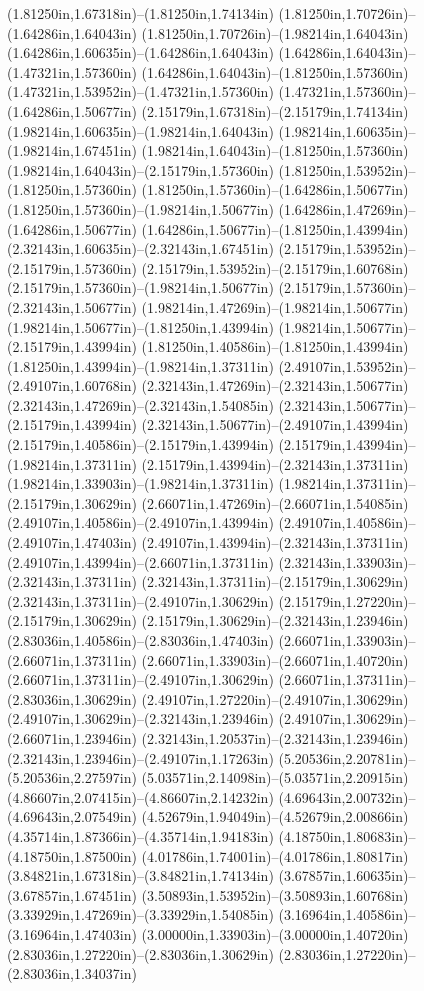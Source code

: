 (1.81250in,1.67318in)--(1.81250in,1.74134in) (1.81250in,1.70726in)--(1.64286in,1.64043in) (1.81250in,1.70726in)--(1.98214in,1.64043in) (1.64286in,1.60635in)--(1.64286in,1.64043in) (1.64286in,1.64043in)--(1.47321in,1.57360in) (1.64286in,1.64043in)--(1.81250in,1.57360in) (1.47321in,1.53952in)--(1.47321in,1.57360in) (1.47321in,1.57360in)--(1.64286in,1.50677in) (2.15179in,1.67318in)--(2.15179in,1.74134in) (1.98214in,1.60635in)--(1.98214in,1.64043in) (1.98214in,1.60635in)--(1.98214in,1.67451in) (1.98214in,1.64043in)--(1.81250in,1.57360in) (1.98214in,1.64043in)--(2.15179in,1.57360in) (1.81250in,1.53952in)--(1.81250in,1.57360in) (1.81250in,1.57360in)--(1.64286in,1.50677in) (1.81250in,1.57360in)--(1.98214in,1.50677in) (1.64286in,1.47269in)--(1.64286in,1.50677in) (1.64286in,1.50677in)--(1.81250in,1.43994in) (2.32143in,1.60635in)--(2.32143in,1.67451in) (2.15179in,1.53952in)--(2.15179in,1.57360in) (2.15179in,1.53952in)--(2.15179in,1.60768in) (2.15179in,1.57360in)--(1.98214in,1.50677in) (2.15179in,1.57360in)--(2.32143in,1.50677in) (1.98214in,1.47269in)--(1.98214in,1.50677in) (1.98214in,1.50677in)--(1.81250in,1.43994in) (1.98214in,1.50677in)--(2.15179in,1.43994in) (1.81250in,1.40586in)--(1.81250in,1.43994in) (1.81250in,1.43994in)--(1.98214in,1.37311in) (2.49107in,1.53952in)--(2.49107in,1.60768in) (2.32143in,1.47269in)--(2.32143in,1.50677in) (2.32143in,1.47269in)--(2.32143in,1.54085in) (2.32143in,1.50677in)--(2.15179in,1.43994in) (2.32143in,1.50677in)--(2.49107in,1.43994in) (2.15179in,1.40586in)--(2.15179in,1.43994in) (2.15179in,1.43994in)--(1.98214in,1.37311in) (2.15179in,1.43994in)--(2.32143in,1.37311in) (1.98214in,1.33903in)--(1.98214in,1.37311in) (1.98214in,1.37311in)--(2.15179in,1.30629in) (2.66071in,1.47269in)--(2.66071in,1.54085in) (2.49107in,1.40586in)--(2.49107in,1.43994in) (2.49107in,1.40586in)--(2.49107in,1.47403in) (2.49107in,1.43994in)--(2.32143in,1.37311in) (2.49107in,1.43994in)--(2.66071in,1.37311in) (2.32143in,1.33903in)--(2.32143in,1.37311in) (2.32143in,1.37311in)--(2.15179in,1.30629in) (2.32143in,1.37311in)--(2.49107in,1.30629in) (2.15179in,1.27220in)--(2.15179in,1.30629in) (2.15179in,1.30629in)--(2.32143in,1.23946in) (2.83036in,1.40586in)--(2.83036in,1.47403in) (2.66071in,1.33903in)--(2.66071in,1.37311in) (2.66071in,1.33903in)--(2.66071in,1.40720in) (2.66071in,1.37311in)--(2.49107in,1.30629in) (2.66071in,1.37311in)--(2.83036in,1.30629in) (2.49107in,1.27220in)--(2.49107in,1.30629in) (2.49107in,1.30629in)--(2.32143in,1.23946in) (2.49107in,1.30629in)--(2.66071in,1.23946in) (2.32143in,1.20537in)--(2.32143in,1.23946in) (2.32143in,1.23946in)--(2.49107in,1.17263in) (5.20536in,2.20781in)--(5.20536in,2.27597in) (5.03571in,2.14098in)--(5.03571in,2.20915in) (4.86607in,2.07415in)--(4.86607in,2.14232in) (4.69643in,2.00732in)--(4.69643in,2.07549in) (4.52679in,1.94049in)--(4.52679in,2.00866in) (4.35714in,1.87366in)--(4.35714in,1.94183in) (4.18750in,1.80683in)--(4.18750in,1.87500in) (4.01786in,1.74001in)--(4.01786in,1.80817in) (3.84821in,1.67318in)--(3.84821in,1.74134in) (3.67857in,1.60635in)--(3.67857in,1.67451in) (3.50893in,1.53952in)--(3.50893in,1.60768in) (3.33929in,1.47269in)--(3.33929in,1.54085in) (3.16964in,1.40586in)--(3.16964in,1.47403in) (3.00000in,1.33903in)--(3.00000in,1.40720in) (2.83036in,1.27220in)--(2.83036in,1.30629in) (2.83036in,1.27220in)--(2.83036in,1.34037in) 